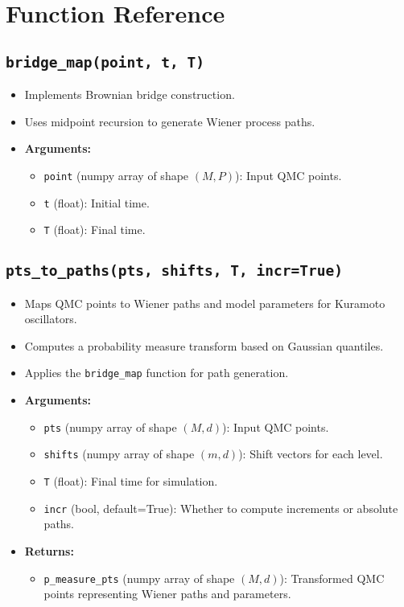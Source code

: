 \documentclass{article}
\begin{document}
\section{Function Reference}

\subsection{\texttt{bridge\_map(point, t, T)}}
\begin{itemize}
    \item Implements Brownian bridge construction.
    \item Uses midpoint recursion to generate Wiener process paths.
    \item \textbf{Arguments:}
    \begin{itemize}
        \item \texttt{point} (numpy array of shape $(M, P)$): Input QMC points.
        \item \texttt{t} (float): Initial time.
        \item \texttt{T} (float): Final time.
    \end{itemize}
\end{itemize}

\subsection{\texttt{pts\_to\_paths(pts, shifts, T, incr=True)}}
\begin{itemize}
    \item Maps QMC points to Wiener paths and model parameters for Kuramoto oscillators.
    \item Computes a probability measure transform based on Gaussian quantiles.
    \item Applies the \texttt{bridge\_map} function for path generation.
    \item \textbf{Arguments:}
    \begin{itemize}
        \item \texttt{pts} (numpy array of shape $(M, d)$): Input QMC points.
        \item \texttt{shifts} (numpy array of shape $(m, d)$): Shift vectors for each level.
        \item \texttt{T} (float): Final time for simulation.
        \item \texttt{incr} (bool, default=True): Whether to compute increments or absolute paths.
    \end{itemize}
    \item \textbf{Returns:}
    \begin{itemize}
        \item \texttt{p\_measure\_pts} (numpy array of shape $(M, d)$): Transformed QMC points representing Wiener paths and parameters.
    \end{itemize}
\end{itemize}
\end{document}
